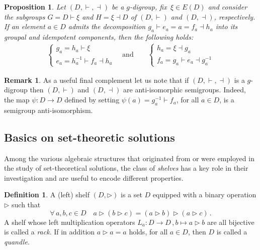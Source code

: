 \documentclass[preprint,1p]{elsarticle}
\numberwithin{equation}{section}
\newtheorem{prop}[theor]{Proposition}
\theoremstyle{definition}               %
\newtheorem{defin}[theor]{Definition}
\newtheorem{rem}[theor]{Remark}
\newcommand{\vd}{\vdash}
\newcommand{\dv}{\dashv}
\newcommand{\tr}{\triangleright}
\begin{document}
\begin{prop}
    Let $(D,\vd,\dv)$ be a $g$-digroup, fix $\,\xi \in E(D)$ and consider the subgroups $G = D \vd \xi$ and $H = \xi \dv D$ of $(D,\vd)$ and $(D,\dv)$, respectively.
    If an element $a \in D$ admits the decomposition $g_a\vd e_a = a = f_a \dv h_a$ into its groupal and idempotent components, then the following holds:
    \begin{align*}
        \begin{cases}
            g_a = h_a \vd \xi \\
            e_a = h_a^{-1} \vd f_a \dv h_a
        \end{cases}
        \quad\text{and}\qquad
        \begin{cases}
            h_a = \xi \dv g_a \\
            f_a = g_a \vd e_a \dv g_a^{-1}
        \end{cases}
    \end{align*}
\end{prop}

\smallskip 

\begin{rem}
    As a useful final complement let us note that if $(D,\vd,\dv)$ is a $g$-digroup then $(D,\vd)$ and $(D,\dv)$ are anti-isomorphic semigroups.
    Indeed, the map $\psi:D \to D$ defined by setting $\psi(a) = g_a^{-1} \vd f_a$, for all $a \in D$, is a semigroup anti-isomorphism. 
\end{rem}

\smallskip

\subsection{Basics on set-theoretic solutions}

Among the various algebraic structures that originated from or were employed in the study of set-theoretical solutions, the class of \emph{shelves} has a key role in their investigation and are useful to encode different properties.

\begin{defin}
    A (left) shelf $(D, \triangleright)$ is a set $D$ equipped with a binary operation $\triangleright$ such that
    \begin{equation}\label{self_distri}
        \forall\, a,b,c\in D\quad a \triangleright (b \triangleright c)= (a \triangleright b) \triangleright (a \triangleright c)\,. 
    \end{equation} 
    A shelf whose left multiplication operators ${L_a:D \to D\,, b \mapsto a \tr b}$ are all bijective is called a \emph{rack}. If in addition $a\triangleright a = a$ holds, for all $a\in D$, then $D$ is called a \emph{quandle}.
\end{defin}
\end{document}
